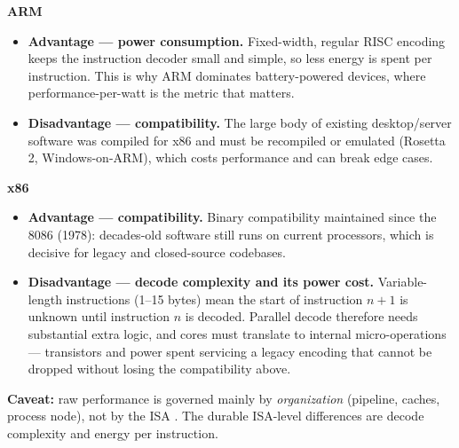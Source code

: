 \begin{answerbox}
\textbf{ARM}
\begin{itemize}[nosep, leftmargin=1.4em]
  \item \textbf{Advantage --- power consumption.} Fixed-width, regular RISC
    encoding keeps the instruction decoder small and simple, so less energy is
    spent per instruction. This is why ARM dominates battery-powered devices,
    where performance-per-watt is the metric that matters.
  \item \textbf{Disadvantage --- compatibility.} The large body of existing
    desktop/server software was compiled for x86 and must be recompiled or
    emulated (Rosetta 2, Windows-on-ARM), which costs performance and can break
    edge cases.
\end{itemize}

\medskip
\textbf{x86}
\begin{itemize}[nosep, leftmargin=1.4em]
  \item \textbf{Advantage --- compatibility.} Binary compatibility maintained
    since the 8086 (1978): decades-old software still runs on current
    processors, which is decisive for legacy and closed-source codebases.
  \item \textbf{Disadvantage --- decode complexity and its power cost.}
    Variable-length instructions (1--15 bytes) mean the start of instruction
    $n+1$ is unknown until instruction $n$ is decoded. Parallel decode therefore
    needs substantial extra logic, and cores must translate to internal
    micro-operations — transistors and power spent servicing a legacy encoding
    that cannot be dropped without losing the compatibility above.
\end{itemize}

\medskip
\textbf{Caveat:} raw performance is governed mainly by \emph{organization}
(pipeline, caches, process node), not by the ISA . The durable
ISA-level differences are decode complexity and energy per instruction.
\end{answerbox}


